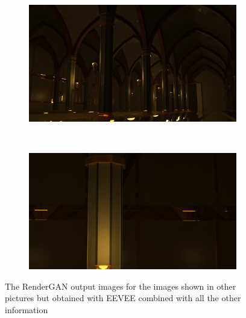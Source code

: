\begin{figure}[h!]
    \centering
    \begin{subfigure}[b]{0.9\textwidth}
     \includegraphics[width=\textwidth]{figures/result/all/s1_camera_95_cycles_RN.png}
     \caption{}\label{subfig:1}
    \end{subfigure}
    \\ \vspace{0.2cm}
    \begin{subfigure}[b]{0.9\textwidth}
     \includegraphics[width=\textwidth]{figures/result/all/s1_camera_2_cycles_RN.png}
     \caption{}
    \end{subfigure}    
    \caption[RenderGAN output]{The RenderGAN output images for the images shown in other pictures but obtained with EEVEE combined with all the other information}
    \label{fig:re
    ndernet_images3}
\end{figure}


